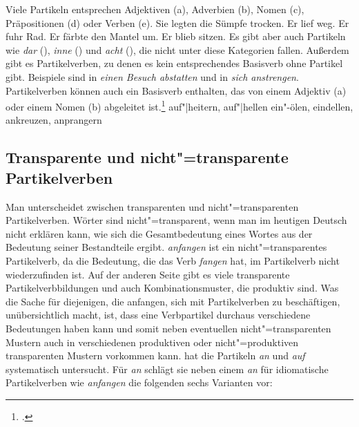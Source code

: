 Viele Partikeln entsprechen Adjektiven (a), Adverbien (b), Nomen (c), 
Präpositionen (d) oder Verben (e).
\eal
\ex{}
Sie legten die Sümpfe trocken.
\ex{}
Er lief weg.
\ex{}
Er fuhr Rad.
\ex{}
Er färbte den Mantel um.
\ex{}
Er blieb sitzen.
\zl
%
Es gibt aber auch Partikeln wie \emph{dar} (), 
\emph{inne} () und \emph{acht} 
(), die nicht unter diese Kategorien fallen.
Außerdem gibt es Partikelverben, zu denen es kein entsprechendes Basisverb ohne
Partikel gibt. Beispiele sind  in \emph{einen Besuch abstatten} und 
 in \emph{sich anstrengen}. Partikelverben können
auch ein Basisverb enthalten, das von einem Adjektiv (a) oder einem Nomen (b) abgeleitet ist.\footnote{
        .%
}
\eal
\ex auf"|heitern, auf"|hellen
\ex ein"-ölen, eindellen, ankreuzen, anprangern
\zl

\subsection{Transparente und nicht"=transparente Partikelverben}

Man unterscheidet zwischen transparenten und nicht"=transparenten Partikelverben. Wörter
sind nicht"=transparent, wenn man im heutigen Deutsch nicht erklären kann, wie sich die
Gesamtbedeutung eines Wortes aus der Bedeutung seiner Bestandteile ergibt. \emph{anfangen}
ist \zb ein nicht"=transparentes Partikelverb, da die Bedeutung, die das Verb \emph{fangen}
hat, im Partikelverb nicht wiederzufinden ist. Auf der anderen Seite gibt es viele transparente
Partikelverbbildungen und auch Kombinationsmuster, die produktiv sind. Was die Sache
für diejenigen, die anfangen, sich mit Partikelverben zu beschäftigen, unübersichtlich macht, ist,
dass eine Verbpartikel durchaus verschiedene Bedeutungen haben kann und somit
neben eventuellen nicht"=transparenten Mustern auch in verschiedenen
produktiven oder nicht"=produktiven transparenten Mustern vorkommen kann.
\citet{Stiebels96a} hat die Partikeln \emph{an} und \emph{auf} systematisch untersucht.
Für \emph{an} schlägt sie neben einem \emph{an} für idiomatische Partikelverben wie \emph{anfangen}
die folgenden sechs Varianten vor:


